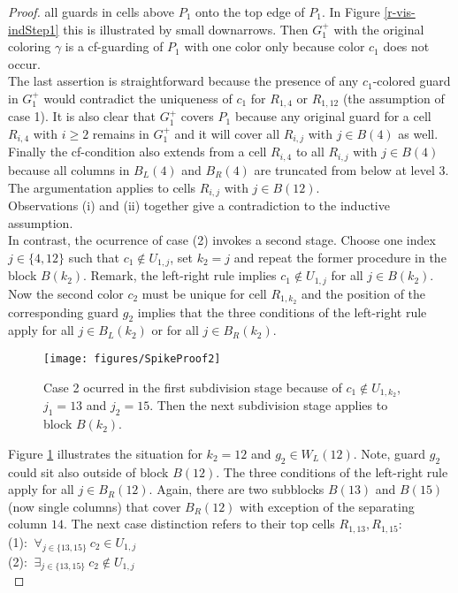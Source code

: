\documentclass[a4paper,USenglish,numberwithinsect]{lipics}
\theoremstyle{plain}
\begin{document}
\begin{proof}
all guards in cells above $P_1$ onto the top edge of $P_1$. In Figure \ref{r-vis-indStep1}
 this is illustrated by small downarrows. Then  $G_1^{+}$
with the original coloring $\gamma$ is a cf-guarding of
$P_1$ with one color only because color $c_1$ does not occur. \\The last
assertion is
straightforward because the presence of any $c_1$-colored guard in
$G_1^{+}$ would contradict
the uniqueness of $c_1$ for  $R_{1,4}$  or $R_{1,12}$ (the assumption of case 1).
It is also clear that $G_1^{+}$ covers $P_1$ because any original guard
for a cell $R_{i,4}$
with $i \geq 2$  remains in $G_1^{+}$ and it will cover all $R_{i,j}$
with $j \in B(4)$ as well. 
Finally the cf-condition also extends from a cell $R_{i,4}$ to all
$R_{i,j}$ with $j \in B(4)$ because all columns in $B_L(4)$ and 
$B_R(4)$ are truncated from
below at level $3$. The  argumentation applies to cells $R_{i,j}$
with $j \in B(12)$. 
\\
Observations (i) and (ii) together give a contradiction to the
inductive assumption.\\
In contrast, the ocurrence of case (2)  invokes a second  stage.
Choose one index $j \in \{4,12\}$ such that  $c_1 \not \in U_{1,j}$, set $k_2=j$
and  repeat the former procedure in the block $B(k_2)$. Remark, the left-right rule
implies $c_1 \not \in U_{1,j}$ for all $j \in B(k_2)$.  
Now the second color $c_2$ must be unique for cell $R_{1,k_2}$ and the position
of the corresponding guard $g_2$ implies that the three conditions of the left-right rule apply 
for all $j \in B_L(k_2)$ or for all $j \in B_R(k_2)$.
\begin{figure}
\centering
    \texttt{[image: figures/SpikeProof2]}
\caption{Case 2 ocurred in the first subdivision stage because of $c_1
\not \in U_{1,k_2}$, $j_1=13$ and $j_2=15$. Then
the next subdivision stage applies to block $B(k_2)$.}
\label{r-vis-indStep2}
\end{figure}
Figure \ref{r-vis-indStep2} illustrates the situation for  $k_2=12$ and  $g_2 \in W_L(12)$.
Note, guard $g_2$ could sit also outside of block $B(12)$.
The three conditions of the left-right rule apply for all $j \in B_R(12)$. 
Again, there are two subblocks  $B(13)$ and $B(15)$ (now single columns) that cover  $B_R(12)$
with exception of the separating column $14$. The next case distinction 
refers to their  top cells $R_{1,13},R_{1,15}$: \\
  (1): $\ \forall_{j \in \{13,15\}}\ c_2 \in U_{1,j}$\\
  (2): $\ \exists_{j \in \{13,15\}} \ c_2 \not\in U_{1,j}$\\

\end{proof}
\end{document}
